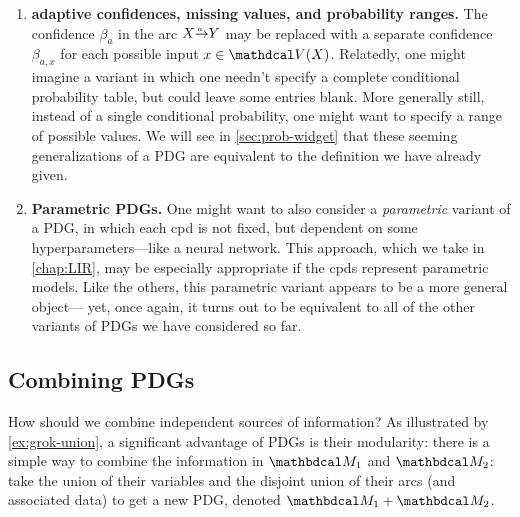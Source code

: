 \begin{enumerate}[wide, label={\textbf{PDG Variant \arabic{*}:}}]
    \item 
    \textbf{adaptive confidences, missing values, and probability ranges.}
    The confidence $\beta_a$ in the arc $\ed aXY$ may be replaced with a separate confidence $\beta_{a,x}$ for each possible input $x \in \V(X)$. 
    Relatedly, one might imagine a variant in which one needn't specify a complete conditional probability table, but could leave some entries blank.
    More generally still, instead of a single conditional probability, one might want to specify a range of possible values. 
    We will see in \cref{sec:prob-widget} that these seeming generalizations of a PDG are equivalent to the definition we have already given. 

    \item 
    \textbf{Parametric PDGs.}
    One might want to also consider a \emph{parametric} variant of a PDG,
		 in which each cpd is not fixed, but dependent on some hyper\-parameters---like a neural network. 
    This approach, which we take in \cref{chap:LIR}, 
		may be especially appropriate if the cpds represent parametric models.
    Like the others, this parametric variant appears to be a more general object---%
	yet, once again, it turns out to be equivalent to all of the other variants of PDGs we have considered so far. 
\end{enumerate}

\subsection{Combining PDGs}
    \label{sec:pdg-combine}

How should we combine independent sources of information? 
%
As illustrated by \cref{ex:grok-union}, a significant advantage of PDGs is their modularity:
there is a simple way to combine the information in $\dg M_1$ and $\dg M_2$: take the union of their variables and the disjoint union of their arcs (and associated data) to get a new PDG, denoted $\dg M_1 + \dg M_2$.
%

